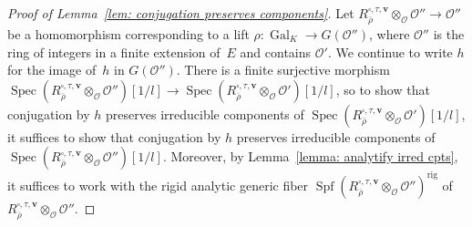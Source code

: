 \documentclass{amsart}
\renewcommand{\mathbb}{\mathbf}
\theoremstyle{definition}
\theoremstyle{remark}
\newcommand{\mar}[1]{}
\newcommand{\mar}[1]{\marginpar{\raggedright\tiny squirrel #1}}
\newcommand{\Z}{\ZZ}
\newcommand{\GG}{{\mathbb G}}
\newcommand{\ZZ}{{\mathbb Z}}
\newcommand{\cO}{{\mathcal O}}
\DeclareMathOperator{\Gal}{Gal}
\DeclareMathOperator{\Hom}{Hom}
\DeclareMathOperator{\Spec}{Spec}
\DeclareMathOperator{\Spf}{Spf}
\newcommand{\rhobar}{\overline{\rho}}
\newcommand{\Ga}{\GG_a}
\newcommand{\Gm}{\GG_m}
\begin{document}
\begin{proof}[Proof of Lemma~\ref{lem: conjugation preserves components}]%
Let $R_{\rhobar}^{\square,\tau,\mathbf{v}}\otimes_{\mathcal{O}}\mathcal{O}''\rightarrow \cO''$ be a
homomorphism corresponding to a lift $\rho:\Gal_K\rightarrow
G(\cO'')$, where $\cO''$ is the ring of integers in a finite extension
of~$E$ and contains $\cO'$. %
We continue to
write $h$ for the image of~$h$ in $G(\cO'')$.  There is a finite surjective morphism $\Spec(R_{\rhobar}^{\square,\tau,\mathbf{v}}\otimes_{\mathcal{O}}\mathcal{O}'')[1/l]\rightarrow\Spec(R_{\rhobar}^{\square,\tau,\mathbf{v}}\otimes_{\cO}\cO')[1/l]$, so to show that conjugation by $h$ preserves irreducible components of $\Spec(R_{\rhobar}^{\square,\tau,\mathbf{v}}\otimes_{\cO}\cO')[1/l]$, it suffices to show that conjugation by $h$ preserves irreducible components of $\Spec(R_{\rhobar}^{\square,\tau,\mathbf{v}}\otimes_{\mathcal{O}}\mathcal{O}'')[1/l]$.  Moreover, by Lemma~\ref{lemma: analytify irred cpts}, it suffices to work with the rigid analytic generic fiber $\Spf(R_{\rhobar}^{\square,\tau,\mathbf{v}}\otimes_{\mathcal{O}}\mathcal{O}'')^{\mathrm{rig}}$ of $R_{\rhobar}^{\square,\tau,\mathbf{v}}\otimes_{\mathcal{O}}\mathcal{O}''$.


\end{proof}
\end{document}
